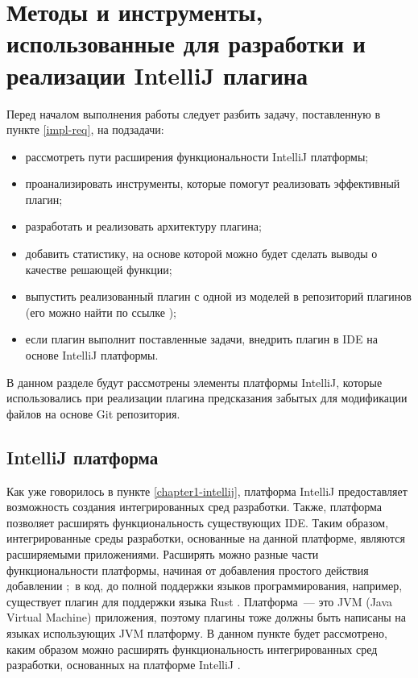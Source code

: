 \section{Методы и инструменты, использованные для разработки и реализации IntelliJ плагина}\label{chapter2-plugin-req}
Перед началом выполнения работы следует разбить задачу, поставленную в пункте \ref{impl-req}, на подзадачи:
    \begin{itemize}
        \item рассмотреть пути расширения функциональности IntelliJ платформы;
        \item проанализировать инструменты, которые помогут реализовать эффективный плагин;
        \item разработать и реализовать архитектуру плагина;
        \item добавить статистику, на основе которой можно будет сделать выводы о качестве решающей функции;
        \item выпустить реализованный плагин с одной из моделей в репозиторий плагинов (его можно найти по ссылке \cite{plugins-jetbrains});
        \item если плагин выполнит поставленные задачи, внедрить плагин в IDE на основе IntelliJ платформы.
    \end{itemize}
В данном разделе будут рассмотрены элементы платформы IntelliJ, которые использовались при реализации плагина предсказания забытых для модификации файлов на основе Git репозитория.
    \subsection{IntelliJ платформа}\label{ij-platform-req}
Как уже говорилось в пункте \ref{chapter1-intellij}, платформа IntelliJ предоставляет возможность создания интегрированных сред разработки. Также, платформа позволяет расширять функциональность существующих IDE. Таким образом, интегрированные среды разработки, основанные на данной платформе, являются расширяемыми приложениями. Расширять можно разные части функциональности платформы, начиная от добавления простого действия добавлении $;$ в код, до полной поддержки языков программирования, например, существует плагин для поддержки языка Rust \cite{rust}. Платформа~--- это JVM (Java Virtual Machine) приложения, поэтому плагины тоже должны быть написаны на языках использующих JVM платформу. В данном пункте будет рассмотрено, каким образом можно расширять функциональность интегрированных сред разработки, основанных на платформе IntelliJ \cite{intellij-sdk}.

